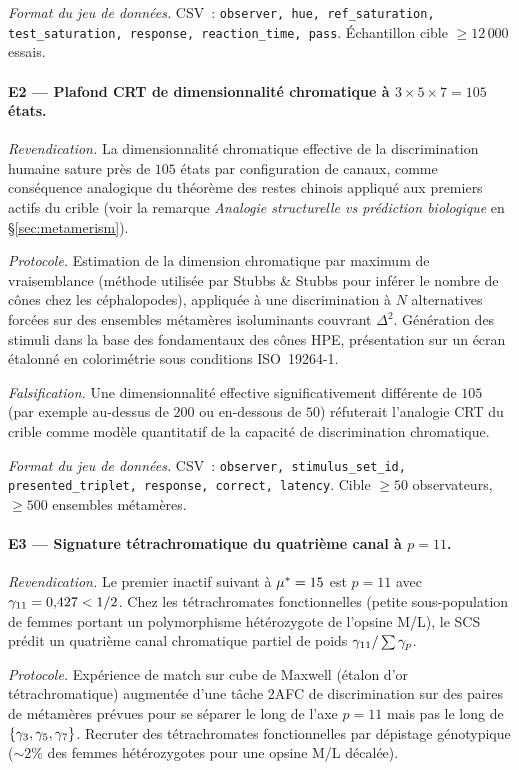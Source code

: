 \documentclass[12pt,a4paper]{article}
\begin{document}
\emph{Format du jeu de donn\'ees.} CSV~: \texttt{observer, hue,
ref\_saturation, test\_saturation, response, reaction\_time, pass}.
\'Echantillon cible $\geq 12\,000$ essais.

\paragraph{E2 --- Plafond CRT de dimensionnalit\'e chromatique
\`a $3 \times 5 \times 7 = 105$ \'etats.}
\emph{Revendication.} La dimensionnalit\'e chromatique effective de la
discrimination humaine sature pr\`es de $105$ \'etats par
configuration de canaux, comme cons\'equence analogique du th\'eor\`eme
des restes chinois appliqu\'e aux premiers actifs du crible (voir la
remarque \emph{Analogie structurelle vs pr\'ediction biologique} en
\S\ref{sec:metamerism}).

\emph{Protocole.} Estimation de la dimension chromatique par maximum
de vraisemblance (m\'ethode utilis\'ee par Stubbs \& Stubbs pour
inf\'erer le nombre de c\^ones chez les c\'ephalopodes), appliqu\'ee
\`a une discrimination \`a $N$ alternatives forc\'ees sur des
ensembles m\'etam\`eres isoluminants couvrant $\Delta^2$. G\'en\'eration
des stimuli dans la base des fondamentaux des c\^ones HPE, pr\'esentation
sur un \'ecran \'etalonn\'e en colorim\'etrie sous conditions
ISO~19264-1.

\emph{Falsification.} Une dimensionnalit\'e effective
significativement diff\'erente de $105$ (par exemple au-dessus de $200$
ou en-dessous de $50$) r\'efuterait l'analogie CRT du crible comme
mod\`ele quantitatif de la capacit\'e de discrimination chromatique.

\emph{Format du jeu de donn\'ees.} CSV~: \texttt{observer,
stimulus\_set\_id, presented\_triplet, response, correct, latency}.
Cible $\geq 50$ observateurs, $\geq 500$ ensembles m\'etam\`eres.

\paragraph{E3 --- Signature t\'etrachromatique du quatri\`eme canal \`a $p = 11$.}
\emph{Revendication.} Le premier inactif suivant \`a ${\mu^{*}} = 15$
est $p = 11$ avec $\gamma_{11} = 0{,}427 < 1/2$. Chez les
t\'etrachromates fonctionnelles (petite sous-population de femmes
portant un polymorphisme h\'et\'erozygote de l'opsine M/L), le SCS
pr\'edit un quatri\`eme canal chromatique partiel de poids
$\gamma_{11}/\sum \gamma_{p}$.

\emph{Protocole.} Exp\'erience de match sur cube de Maxwell
(\'etalon d'or t\'etrachromatique) augment\'ee d'une t\^ache 2AFC de
discrimination sur des paires de m\'etam\`eres pr\'evues pour se
s\'eparer le long de l'axe $p = 11$ mais pas le long de
$\{\gamma_{3}, \gamma_{5}, \gamma_{7}\}$. Recruter des t\'etrachromates
fonctionnelles par d\'epistage g\'enotypique ($\sim 2\%$ des femmes
h\'et\'erozygotes pour une opsine M/L d\'ecal\'ee).
\end{document}
